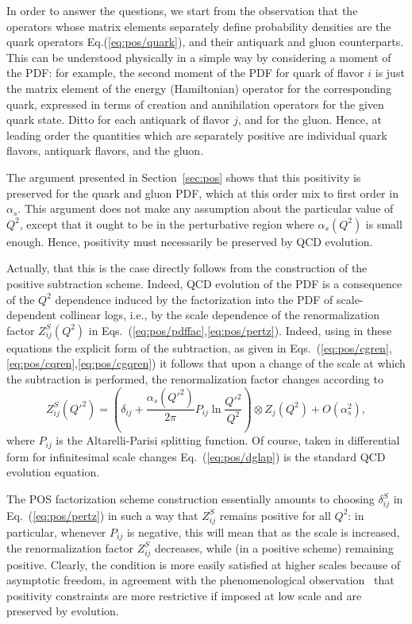 In order to answer the questions, we start from the observation that
the operators whose matrix elements separately define probability densities are
the quark operators Eq.(\ref{eq:pos/quark}), and their antiquark and gluon
counterparts. This can be understood physically in a simple way by
considering a moment of the PDF: for example, the second moment of the
PDF for quark of flavor $i$ is just the matrix element of the energy
(Hamiltonian) operator for the corresponding quark, expressed in terms
of creation and annihilation operators for the given quark state.
Ditto for each antiquark of
flavor $j$, and for the gluon. Hence, at leading order the quantities
which are separately positive are individual quark flavors, antiquark
flavors, and the gluon.

The argument presented in Section~\ref{sec:pos} shows that this
positivity is preserved for the quark and gluon PDF, which at this
order mix to first order in $\alpha_s$. This argument does not make
any assumption about the particular value of $Q^2$, except that it
ought to be in the perturbative region where $\alpha_s(Q^2)$ is small
enough. Hence, positivity must necessarily be preserved by QCD
evolution.

Actually,  that this is the case directly follows from the construction of the
positive subtraction scheme.
Indeed, QCD evolution of the PDF is a consequence of the $Q^2$
dependence induced by the factorization into the PDF of
scale-dependent collinear logs, i.e., by the scale dependence of the
renormalization factor $Z^S_{ij}(Q^2)$ in
Eqs.~(\ref{eq:pos/pdffac},\ref{eq:pos/pertz}). Indeed, using in these
equations
the explicit form
of the subtraction, as given in
Eqs.~(\ref{eq:pos/cgren},\ref{eq:pos/cqren},\ref{eq:pos/cgqren}) it follows that
upon a change of the scale at which the subtraction is performed, the
renormalization factor changes according to
\begin{equation}\label{eq:pos/dglap}
  Z^S_{ij}({Q'}^2)=\left(\delta_{ij}+\frac{\alpha_s({Q'}^2)}{2\pi}P_{ij}\ln\frac{{Q'}^2}{Q^2}\right)\otimes
  Z_j(Q^2) +O(\alpha_s^2),
\end{equation}
where $P_{ij}$ is the Altarelli-Parisi splitting function. Of course,
taken in differential form for infinitesimal scale changes
Eq.~(\ref{eq:pos/dglap}) is the standard QCD evolution equation.

The POS factorization scheme construction essentially amounts to
choosing $\delta^{S}_{ij}$ in Eq.~(\ref{eq:pos/pertz}) in  such a way that
$Z_{ij}^{S}$ remains positive for all $Q^2$: in particular, whenever
$P_{ij}$ is negative, this will mean that as the scale is increased,
the renormalization factor $Z_{ij}^S$ decreases, while (in a positive
scheme) remaining positive. Clearly, the condition is more easily
satisfied at higher scales because of asymptotic freedom, in agreement
with the phenomenological observation~\cite{Ball:2010de,Ball:2014uwa}
that positivity constraints are more restrictive if imposed at low
scale and are preserved by evolution.

